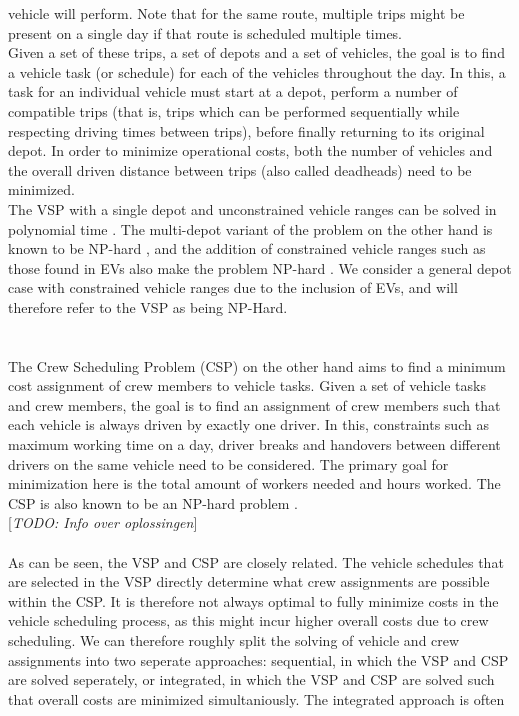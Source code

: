 \documentclass[ht]{article}
\newcommand{\todo}[1]{{\color{red}[\textit{TODO: #1}]}}
\begin{document}
vehicle will perform. Note that for the same route, multiple trips might be
present on a single day if that route is scheduled multiple times. \\ Given a
set of these trips, a set of depots and a set of vehicles, the goal is to find
a vehicle task (or schedule) for each of the vehicles throughout the day. In
this, a task for an individual vehicle must start at a depot, perform a number
of compatible trips (that is, trips which can be performed sequentially while
respecting driving times between trips), before finally returning to its
original depot. In order to minimize operational costs, both the number of
vehicles and the overall driven distance between trips (also called deadheads)
need to be minimized. \\ The VSP with a single depot and unconstrained vehicle
ranges can be solved in polynomial time \cite{Freling2003SDVSP}. The
multi-depot variant of the problem on the other hand is known to be NP-hard
\cite{Bodin1983, Bertossi1987, Even1975}, and the addition of constrained
vehicle ranges such as those found in EVs also make the problem NP-hard
\cite{Bodin1983, Sassi2014}. We consider a general depot case with constrained
vehicle ranges due to the inclusion of EVs, and will therefore refer to the VSP
as being NP-Hard. \\
\\\\ The Crew Scheduling Problem (CSP) on the other hand aims to find a minimum
cost assignment of crew members to vehicle tasks. Given a set of vehicle tasks
and crew members, the goal is to find an assignment of crew members such that
each vehicle is always driven by exactly one driver. In this, constraints such
as maximum working time on a day, driver breaks and handovers between different
drivers on the same vehicle need to be considered. The primary goal for
minimization here is the total amount of workers needed and hours worked. The
CSP is also known to be an NP-hard problem \cite{Fischetti1989}.\\ \todo{Info
  over oplossingen} \\\\ 
As can be seen, the VSP and CSP are closely related. The
vehicle schedules that are selected in the VSP directly determine what crew
assignments are possible within the CSP. It is therefore not always optimal to
fully minimize costs in the vehicle scheduling process, as this might incur
higher overall costs due to crew scheduling. We can therefore roughly split the solving of vehicle and crew assignments into two seperate approaches: sequential, in which the VSP and CSP are solved seperately, or integrated, in which the VSP and CSP are solved such that overall costs are minimized simultaniously. The integrated approach is often
\end{document}
